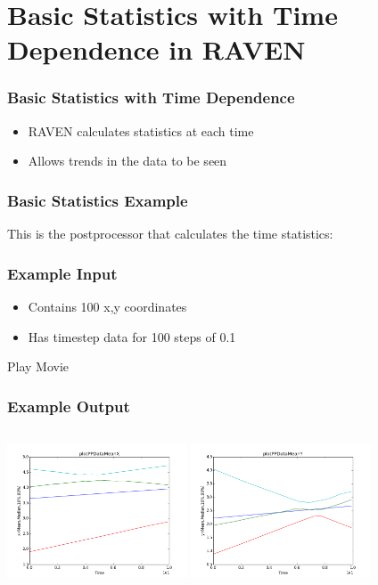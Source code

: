 \documentclass[t,9pt,svgnames]{beamer}
\begin{document}
\section{Basic Statistics with Time Dependence in RAVEN}

\begin{frame}
  \frametitle{Basic Statistics with Time Dependence}
  \begin{itemize}
  \item RAVEN calculates statistics at each time
  \item Allows trends in the data to be seen
  \end{itemize}
\end{frame}

\begin{frame}[fragile]
  \frametitle{Basic Statistics Example}
  This is the postprocessor that calculates the time statistics:
  

\end{frame}

\begin{frame}
  \frametitle{Example Input}
  \begin{itemize}
  \item Contains 100 x,y coordinates
  \item Has timestep data for 100 steps of 0.1
  \end{itemize}
  Play Movie  
\end{frame}

\begin{frame}
  \frametitle{Example Output}
  \begin{columns}
    \includegraphics[height=4cm]{images/plotPPDataMeanX.png}
    \includegraphics[height=4cm]{images/plotPPDataMeanY.png}
  \end{columns}
\end{frame}
\end{document}
